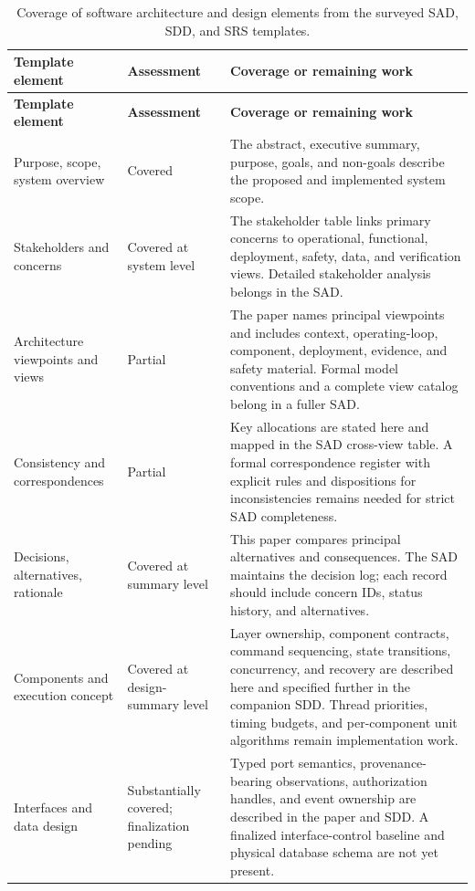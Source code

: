 \documentclass[11pt,a4paper]{article}
\begin{document}
\clearpage
\begin{landscape}
\thispagestyle{plain}
\begin{longtable}{@{}p{1.45in}p{1.25in}p{4.85in}@{}}
\caption{Coverage of software architecture and design elements from the surveyed SAD, SDD, and SRS templates.}\label{tab:template-coverage}\\
\toprule
\textbf{Template element} & \textbf{Assessment} & \textbf{Coverage or remaining work}\\
\midrule
\endfirsthead
\toprule
\textbf{Template element} & \textbf{Assessment} & \textbf{Coverage or remaining work}\\
\midrule
\endhead
Purpose, scope, system overview & Covered & The abstract, executive summary, purpose, goals, and non-goals describe the proposed and implemented system scope. \\
Stakeholders and concerns & Covered at system level & The stakeholder table links primary concerns to operational, functional, deployment, safety, data, and verification views. Detailed stakeholder analysis belongs in the SAD. \\
Architecture viewpoints and views & Partial & The paper names principal viewpoints and includes context, operating-loop, component, deployment, evidence, and safety material. Formal model conventions and a complete view catalog belong in a fuller SAD. \\
Consistency and correspondences & Partial & Key allocations are stated here and mapped in the SAD cross-view table. A formal correspondence register with explicit rules and dispositions for inconsistencies remains needed for strict SAD completeness. \\
Decisions, alternatives, rationale & Covered at summary level & This paper compares principal alternatives and consequences. The SAD maintains the decision log; each record should include concern IDs, status history, and alternatives. \\
Components and execution concept & Covered at design-summary level & Layer ownership, component contracts, command sequencing, state transitions, concurrency, and recovery are described here and specified further in the companion SDD. Thread priorities, timing budgets, and per-component unit algorithms remain implementation work. \\
Interfaces and data design & Substantially covered; finalization pending & Typed port semantics, provenance-bearing observations, authorization handles, and event ownership are described in the paper and SDD. A finalized interface-control baseline and physical database schema are not yet present. \\

\end{longtable}
\end{landscape}
\end{document}
